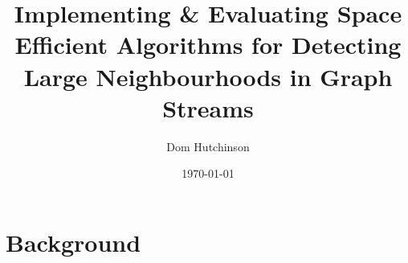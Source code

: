 \documentclass[11pt,twoside,a4paper]{report}
\begin{document}
\renewcommand{\headrulewidth}{0pt}
\newcommand{\ie}{\textit{i.e.} }
\newcommand{\nats}{\mathbb{N} }
\newcommand{\horizontalline}{\newline\vspace{.3cm}\hfill\makebox[.5\linewidth]{\rule{.5\textwidth}{0.4pt}}\hfill\vspace{.1cm}}
\title{Implementing \& Evaluating Space Efficient Algorithms for Detecting Large Neighbourhoods in Graph Streams}
\author{Dom Hutchinson}
\date{\today}
\maketitle

\pagestyle{fancy}
\fancyhead[C]{}
\fancyhead[R]{\today}

\chapter{Background}
\end{document}
